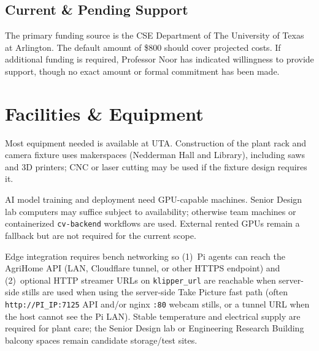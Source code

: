 \documentclass[11pt,letterpaper]{article}
\begin{document}
\subsection{Current \& Pending Support}
The primary funding source is the CSE Department of The University of Texas at Arlington. The
default amount of \$800 should cover projected costs. If additional funding is required, Professor Noor
has indicated willingness to provide support, though no exact amount or formal commitment has been
made.

\section{Facilities \& Equipment}
Most equipment needed is available at UTA. Construction of the plant rack and camera fixture uses
makerspaces (Nedderman Hall and Library), including saws and 3D printers; CNC or laser cutting may
be used if the fixture design requires it.

AI model training and deployment need GPU-capable machines. Senior Design lab computers may
suffice subject to availability; otherwise team machines or containerized \texttt{cv-backend} workflows
are used. External rented GPUs remain a fallback but are not required for the current scope.

Edge integration requires bench networking so (1)~Pi agents can reach the AgriHome API (LAN,
Cloudflare tunnel, or other HTTPS endpoint) and (2)~optional HTTP streamer URLs on \texttt{klipper\_url} are reachable when server-side stills are used
when using the server-side Take Picture fast path (often \texttt{http://PI\_IP:7125} API and/or nginx
\texttt{:80} webcam stills, or a tunnel URL when the host cannot see the Pi LAN). Stable temperature
and electrical supply are required for plant care; the Senior Design lab or Engineering Research
Building balcony spaces remain candidate storage/test sites.
\end{document}
